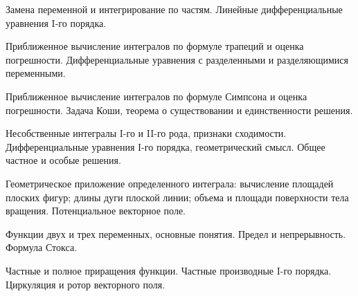 \documentclass[
	14pt,
	a4paper,
	]
	{scrartcl}
\begin{document}
\shapk
{}
\setcounter{zad}{0}

\vfill
\z Замена переменной и интегрирование по частям.
 \vfill
\z Линейные дифференциальные уравнения I-го порядка.
 \vfill

\vfill

\newpage


\shapk
{}
\setcounter{zad}{0}

\vfill
\z Приближенное вычисление интегралов по формуле трапеций и оценка погрешности.
 \vfill
\z Дифференциальные уравнения с разделенными и разделяющимися переменными.
 \vfill

\vfill

\newpage


\shapk
{}
\setcounter{zad}{0}

\vfill
\z Приближенное вычисление интегралов по формуле Симпсона и оценка погрешности.
 \vfill
\z Задача Коши, теорема о существовании и единственности решения.
 \vfill

\vfill

\newpage


\shapk
{}
\setcounter{zad}{0}

\vfill
\z Несобственные интегралы I-го и II-го рода, признаки сходимости.
 \vfill
\z Дифференциальные уравнения I-го порядка, геометрический смысл. Общее частное и особые решения.
 \vfill

\vfill

\newpage


\shapk
{}
\setcounter{zad}{0}

\vfill
\z Геометрическое приложение определенного интеграла: вычисление площадей плоских фигур; длины дуги плоской линии; объема и площади поверхности тела вращения.
 \vfill
\z Потенциальное векторное поле.
 \vfill

\vfill

\newpage


\shapk
{}
\setcounter{zad}{0}

\vfill
\z Функции двух и трех переменных, основные понятия. Предел и непрерывность.
 \vfill
\z Формула Стокса.
 \vfill

\vfill

\newpage


\shapk
{}
\setcounter{zad}{0}

\vfill
\z Частные и полное приращения функции. Частные производные I-го порядка.
 \vfill
\z Циркуляция и ротор векторного поля.
 \vfill
\end{document}
